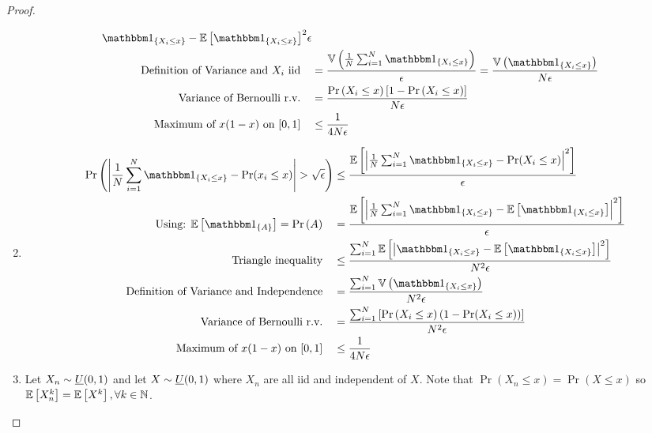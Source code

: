 \documentclass[12pt, letterpaper]{paper}
\begin{document}
\begin{question}
\begin{proof}
\begin{enumerate}
\begin{align*}
{{{                                \indicate{X_i \leq x} - \exV{ \indicate{ X_i \leq
          x}}}^2}}{\epsilon}\\
        \text{ Definition of Variance and } X_i \text{ iid} \quad&= \frac{\Vari{\frac{1}{N}\sum_{i=1}^N
                                \indicate{ X_i \leq x}}}{\epsilon} =
                                \frac{\Vari{\indicate{X_i \leq x}}}{N \epsilon}\\
        \text{Variance of Bernoulli r.v.} \quad&= \frac{\Pr \left( X_i \leq x \right ) \brak{ 1 - \Pr \left(  X_i \leq x  \right )}}{N \epsilon}\\
        \text{ Maximum of }x(1-x) \text{ on }[0,1] \quad&\leq \frac{1}{4 N \epsilon}\\
      \end{align*}
    \item
      \begin{align*}
        \Pr \left ( \abs{ \frac{1}{N} \sum_{i = 1}^N \indicate{X_i \leq x} - \Pr(
        x_i \leq x)} > \sqrt{\epsilon} \right ) &\leq \frac{\exV{\abs{\frac{1}{N}\sum_{i=1}^N
                                \indicate{X_i \leq x} - \Pr( X_i \leq
                                x)}^2}}{\epsilon}\\
        \text{ Using:  } \exV{\indicate{A}} = \Pr \left( A \right ) \quad
                                      &= \frac{\exV{\abs{\frac{1}{N}\sum_{i=1}^N
                                \indicate{X_i \leq x} - \exV{ \indicate{ X_i \leq
                                        x}}}^2}}{\epsilon}\\
        \text{ Triangle inequality} \quad
        &\leq \frac{\sum_{i=1}^N \exV{ \abs{ \indicate{X_i \leq x} -
          \exV{\indicate{X_i \leq x}}}^2}}{N^2 \epsilon}\\
        \text{Definition of Variance and Independence} \quad
                              &= \frac{\sum_{i=1}^N \Vari{\indicate{X_i \leq
                                x}}}{N^2 \epsilon}\\
        \text{Variance of Bernoulli r.v.} \quad
        &= \frac{\sum_{i=1}^N \brak{ \Pr \left(  X_i \leq x \right ) \left( 1 - \Pr(X_i \leq
          x) \right)}}{N^2 \epsilon}\\
        \text{ Maximum of }x(1-x) \text{ on }[0,1] \quad  &\leq \frac{1}{4 N \epsilon}\\
      \end{align*}
      
    \item Let $X_n \sim \emph{U}( 0,1 )$ and let $X \sim \emph{U}( 0,1)$ where $X_n$ are
      all iid and independent of $X$. Note that $\Pr \left(  X_n \leq x \right ) = \Pr( X
      \leq x)$ so $\mathbb{E} \left [ X_n^k \right ] = \mathbb{E} \left [ X^k \right ], \forall k \in \mathbb{N}$.


\end{enumerate}
\end{proof}
\end{question}
\end{document}

